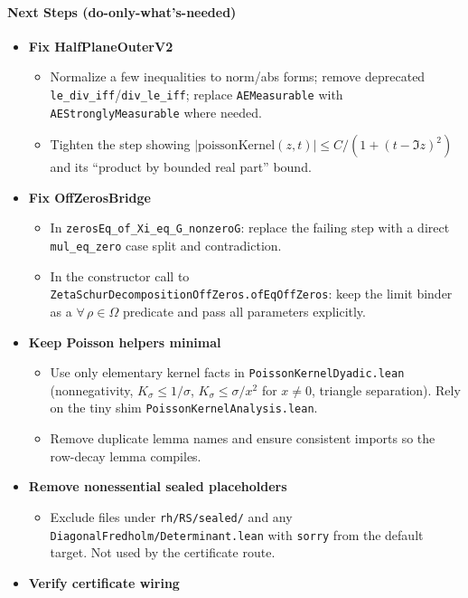 \paragraph{Next Steps (do-only-what’s-needed)}
\begin{itemize}
  \item \textbf{Fix HalfPlaneOuterV2}
  \begin{itemize}
    \item Normalize a few inequalities to norm/abs forms; remove deprecated \texttt{le\_div\_iff}/\texttt{div\_le\_iff}; replace \texttt{AEMeasurable} with \texttt{AEStronglyMeasurable} where needed.
    \item Tighten the step showing $|\mathrm{poissonKernel}(z,t)| \le C/(1+(t-\Im z)^2)$ and its “product by bounded real part” bound.
  \end{itemize}
  \item \textbf{Fix OffZerosBridge}
  \begin{itemize}
    \item In \texttt{zerosEq\_of\_Xi\_eq\_G\zeta\_nonzeroG}: replace the failing step with a direct \texttt{mul\_eq\_zero} case split and contradiction.
    \item In the constructor call to \texttt{ZetaSchurDecompositionOffZeros.ofEqOffZeros}: keep the limit binder as a $\forall\,\rho\in\Omega$ predicate and pass all parameters explicitly.
  \end{itemize}
  \item \textbf{Keep Poisson helpers minimal}
  \begin{itemize}
    \item Use only elementary kernel facts in \texttt{PoissonKernelDyadic.lean} (nonnegativity, $K_\sigma \le 1/\sigma$, $K_\sigma \le \sigma/x^2$ for $x\neq0$, triangle separation). Rely on the tiny shim \texttt{PoissonKernelAnalysis.lean}.
    \item Remove duplicate lemma names and ensure consistent imports so the row-decay lemma compiles.
  \end{itemize}
  \item \textbf{Remove nonessential sealed placeholders}
  \begin{itemize}
    \item Exclude files under \texttt{rh/RS/sealed/} and any \texttt{DiagonalFredholm/Determinant.lean} with \texttt{sorry} from the default target. Not used by the certificate route.
  \end{itemize}
  \item \textbf{Verify certificate wiring}

\end{itemize}
